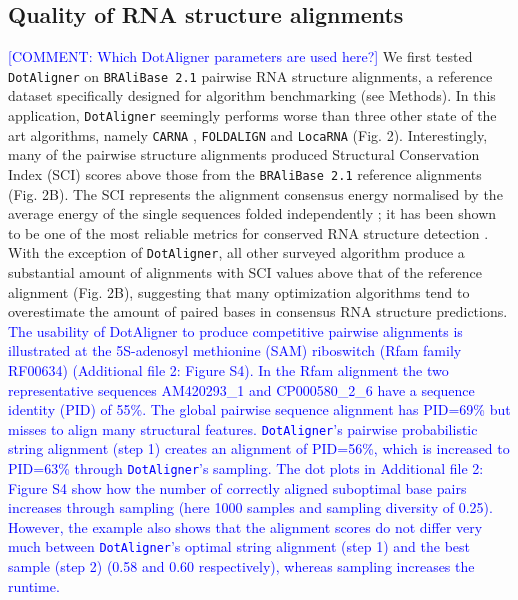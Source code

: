 \documentclass{bmcart}
\newcommand\dotaligner{\texttt{DotAligner}}
\newcommand\bralibase{\texttt{BRAliBase 2.1}}
\newcommand\locarna{\texttt{LocaRNA}}
\newcommand\foldalign{\texttt{FOLDALIGN}}
\newcommand\carna{\texttt{CARNA}}
\begin{document}
\subsection*{Quality of RNA structure alignments}

\textcolor{blue}{[COMMENT: Which DotAligner parameters are used here?]}
We first tested \dotaligner{} on \bralibase{} pairwise RNA structure alignments, a reference 
dataset specifically designed for algorithm benchmarking 
\cite{Gardner15860779,wilm2006enhanced} (see Methods). In this application, \dotaligner{} seemingly  
performs worse than three other state of the art algorithms, namely \carna{} \cite{Sorescu2012}, \foldalign{} \cite{havgaard2007fast,sundfeld2015foldalign} and \locarna{} \cite{Will17432929}
(Fig. 2). Interestingly, many of the pairwise structure alignments produced Structural 
Conservation Index (SCI) scores above those from the \bralibase{} reference alignments 
(Fig. 2B). The SCI represents the alignment consensus energy normalised
 by the average energy of the single sequences folded independently \cite{washietl2005fast}; 
it has been shown to be one of the most reliable metrics for conserved RNA structure 
detection \cite{gruber2008strategies}. With the exception of \dotaligner{}, all other 
surveyed algorithm produce a substantial amount of alignments with SCI values 
above that of the reference  alignment (Fig. 2B), suggesting that many optimization 
algorithms tend to overestimate the amount of paired bases in consensus RNA structure predictions. \\

\textcolor{blue}{
The usability of DotAligner to produce competitive pairwise alignments is
illustrated at the 5S-adenosyl methionine (SAM) riboswitch (Rfam family
RF00634) (Additional file 2: Figure S4). In the Rfam alignment the two
representative sequences AM420293\_1 and CP000580\_2\_6 have a sequence
identity (PID) of 55\%. The global pairwise sequence alignment has PID=69\% but misses to align many structural features. \dotaligner's pairwise probabilistic string alignment
(step 1) creates an alignment of PID=56\%, which is increased to PID=63\% through
\dotaligner's sampling. The dot plots in Additional file 2: Figure S4 show how
the number of correctly aligned suboptimal base pairs increases through sampling (here 1000
samples and sampling diversity of 0.25). However, the example also shows that
the alignment scores do not differ very much between \dotaligner's optimal string alignment (step 1) and the best sample (step 2) (0.58 and 0.60 respectively),
whereas sampling increases the runtime. \\ 
}
\end{document}
